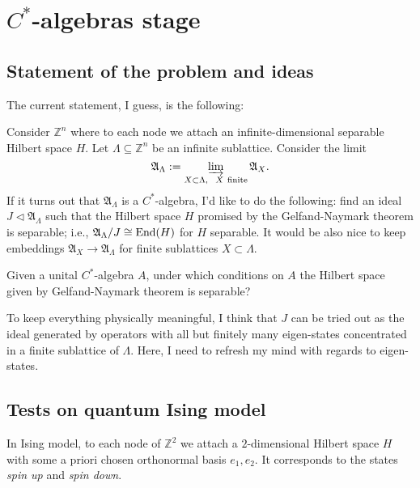 \section{$C^*$-algebras stage}
\subsection{Statement of the problem and ideas}
The current statement, I guess, is the following:

\begin{statement}
Consider $\mathbb Z^n$ where to each node we attach an infinite-dimensional separable Hilbert space $H$. Let $\Lambda \subseteq \mathbb Z^n$ be an infinite sublattice. Consider the limit
\[
\mathfrak A_{\Lambda} := \varinjlim_{X \subset \Lambda, \ \ X\ \text{finite}} \mathfrak A_{X}.
\]
If it turns out that $\mathfrak A_{\Lambda}$ is a $C^*$-algebra, I'd like to do the following: find an ideal $J \triangleleft \mathfrak A_{\Lambda}$ such that the Hilbert space $H$ promised by the Gelfand-Naymark theorem is separable; i.e., $\mathfrak A_{\Lambda}/J \cong \operatorname{End}(H)$ for $H$ separable. It would be also nice to keep embeddings $\mathfrak A_{X} \rightarrow \mathfrak A_{\Lambda}$ for finite sublattices $X \subset \Lambda$.
\end{statement}

\begin{fur}
Given a unital $C^*$-algebra $A$, under which conditions on $A$ the Hilbert space given by Gelfand-Naymark theorem is separable?
\end{fur}

\begin{idea}
To keep everything physically meaningful, I think that $J$ can be tried out as the ideal generated by operators with all but finitely many eigen-states concentrated in a finite sublattice of $\Lambda$. Here, I need to refresh my mind with regards to eigen-states.
\end{idea}

\subsection{Tests on quantum Ising model}
In Ising model, to each node of $\mathbb Z^2$ we attach a $2$-dimensional Hilbert space $H$ with some a priori chosen orthonormal basis $e_1,e_2$. It corresponds to the states \emph{spin up} and \emph{spin down}.
